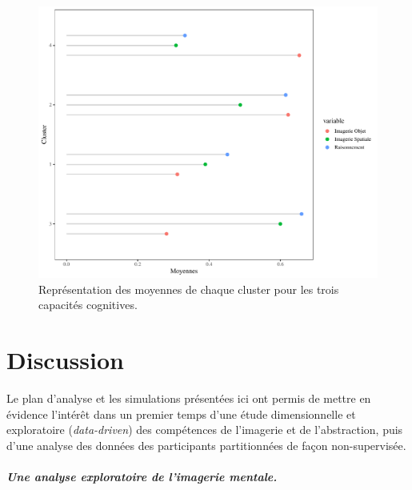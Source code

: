 \documentclass[
  12pt,
]{article}
\let\oldsubparagraph\subparagraph
\renewcommand{\subparagraph}[1]{\oldsubparagraph{#1}\mbox{}}
\begin{document}
\begin{figure}[H]

\includegraphics[width=\textwidth,height=0.5\textheight]{aphantasia_quarto_files/figure-pdf/lollipop-1.pdf}

\caption{Représentation des moyennes de chaque cluster pour les trois capacités cognitives.}
\label{lollipop}
\end{figure}

\hypertarget{discussion}{%
\section{Discussion}\label{discussion}}

Le plan d'analyse et les simulations présentées ici ont permis de mettre
en évidence l'intérêt dans un premier temps d'une étude dimensionnelle
et exploratoire (\emph{data-driven}) des compétences de l'imagerie et de
l'abstraction, puis d'une analyse des données des participants
partitionnées de façon non-supervisée.

\hypertarget{une-analyse-exploratoire-de-limagerie-mentale.}{%
\subparagraph{Une analyse exploratoire de l'imagerie
mentale.}\label{une-analyse-exploratoire-de-limagerie-mentale.}}
\end{document}
